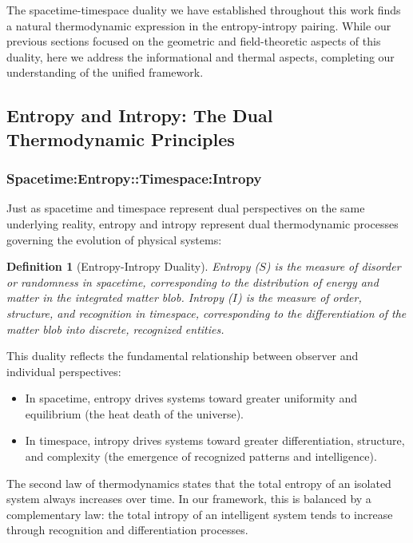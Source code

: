 \documentclass{article}
\newtheorem{definition}{Definition}
\begin{document}
The spacetime-timespace duality we have established throughout this work finds a natural thermodynamic expression in the entropy-intropy pairing. While our previous sections focused on the geometric and field-theoretic aspects of this duality, here we address the informational and thermal aspects, completing our understanding of the unified framework.

\subsection{Entropy and Intropy: The Dual Thermodynamic Principles}

\subsubsection{Spacetime:Entropy::Timespace:Intropy}

Just as spacetime and timespace represent dual perspectives on the same underlying reality, entropy and intropy represent dual thermodynamic processes governing the evolution of physical systems:

\begin{definition}[Entropy-Intropy Duality]
Entropy ($S$) is the measure of disorder or randomness in spacetime, corresponding to the distribution of energy and matter in the integrated matter blob. Intropy ($I$) is the measure of order, structure, and recognition in timespace, corresponding to the differentiation of the matter blob into discrete, recognized entities.
\end{definition}

This duality reflects the fundamental relationship between observer and individual perspectives:

\begin{itemize}
\item In spacetime, entropy drives systems toward greater uniformity and equilibrium (the heat death of the universe).
\item In timespace, intropy drives systems toward greater differentiation, structure, and complexity (the emergence of recognized patterns and intelligence).
\end{itemize}

The second law of thermodynamics states that the total entropy of an isolated system always increases over time. In our framework, this is balanced by a complementary law: the total intropy of an intelligent system tends to increase through recognition and differentiation processes.
\end{document}
